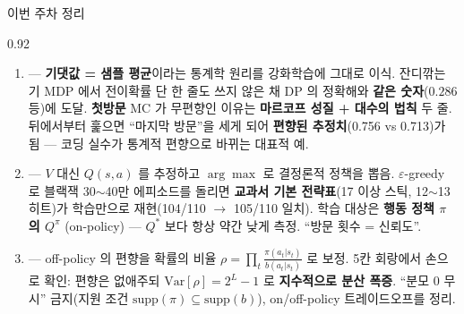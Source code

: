\begin{frame}{이번 주차 정리}
\begin{center}\begin{varwidth}{0.92\textwidth}
  \begin{enumerate}
    \item {} --- \textbf{기댓값 = 샘플
      평균}이라는 통계학 원리를 강화학습에 그대로 이식.
      잔디깎는 기 MDP 에서 전이확률 단 한 줄도 쓰지 않은 채
      DP 의 정확해와 \textbf{같은 숫자}($0.286$ 등)에
      도달. \textbf{첫방문} MC 가 무편향인 이유는
      \textbf{마르코프 성질 + 대수의 법칙} 두 줄. 뒤에서부터
      훑으면 ``마지막 방문''을 세게 되어 \textbf{편향된
      추정치}(0.756 vs 0.713)가 됨 --- 코딩 실수가 통계적
      편향으로 바뀌는 대표적 예.
    \item {} --- $V$ 대신 $Q(s,a)$ 를
      추정하고 $\arg\max$ 로 결정론적 정책을 뽑음.
      $\varepsilon$-greedy 로 블랙잭 30$\sim$40만 에피소드를
      돌리면 \textbf{교과서 기본 전략표}(17 이상 스틱,
      12$\sim$13 히트)가 학습만으로 재현(104/110 $\to$ 105/110
      일치). 학습 대상은 \textbf{행동 정책 $\pi$ 의
      $Q^\pi$} (on-policy) --- $Q^{*}$ 보다 항상 약간
      낮게 측정. ``방문 횟수 = 신뢰도''.
    \item {} --- off-policy 의
      편향을 확률의 비율
      $\rho = \prod_t \frac{\pi(a_t|s_t)}{b(a_t|s_t)}$
      로 보정. 5칸 회랑에서 손으로 확인: 편향은 없애주되
      $\text{Var}[\rho] = 2^L - 1$ 로 \textbf{지수적으로
      분산 폭증}. ``분모 0 무시'' 금지(지원 조건
      $\text{supp}(\pi) \subseteq \text{supp}(b)$),
      on/off-policy 트레이드오프를 정리.
  \end{enumerate}
\end{varwidth}\end{center}
\end{frame}

